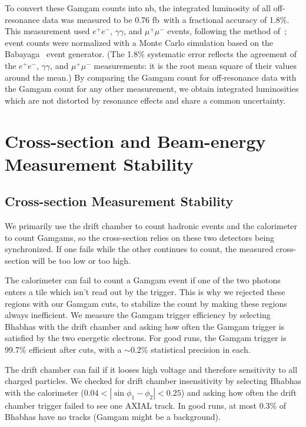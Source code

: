 \documentclass[aps,prd,preprint,superscriptaddress,tightenlines,nofootinbib,floatfix]{revtex4}
\begin{document}
To \label{pag:lumical} convert these Gamgam counts into nb\inv, the
integrated luminosity of all off-resonance data was measured to be
0.76 fb\inv\ with a fractional accuracy of 1.8\%.  This measurement
used $e^+e^-$, $\gamma\gamma$, and $\mu^+\mu^-$ events, following the
method of~\cite{LUMINS}; event counts were normalized with a Monte
Carlo simulation based on the Babayaga~\cite{babayaga} event
generator.  (The 1.8\% systematic error reflects the agreement of the
$e^+e^-$, $\gamma\gamma$, and $\mu^+\mu^-$ measurements: it is the
root mean square of their values around the mean.)  By comparing the
Gamgam count for off-resonance data with the Gamgam count for any
other measurement, we obtain integrated luminosities which are not
distorted by resonance effects and share a common uncertainty.

%
\section{Cross-section and Beam-energy Measurement Stability}
%

%
\subsection{Cross-section Measurement Stability} \label{sec:csstab}
%

We primarily use the drift chamber to count hadronic events and the
calorimeter to count Gamgams, so the cross-section relies on these two
detectors being synchronized.  If one fails while the other continues to count,
the measured cross-section will be too low or too high.

The calorimeter can fail to count a Gamgam event if one of the two
photons enters a tile which isn't read out by the trigger.  This is
why we rejected these regions with our Gamgam cuts, to stabilize the
count by making these regions always inefficient.  We measure the
Gamgam trigger efficiency by selecting Bhabhas with the drift chamber
and asking how often the Gamgam trigger is satisfied by the two
energetic electrons.  For good runs, the Gamgam trigger is 99.7\%
efficient after cuts, with a $\sim$0.2\% statistical precision in each.

The drift chamber can fail if it looses high voltage and therefore
sensitivity to all charged particles.  We checked for drift chamber
insensitivity by selecting Bhabhas with the calorimeter ($0.04 < |\sin
\phi_1 - \phi_2| < 0.25$) and asking how often the drift chamber
trigger failed to see one AXIAL track.  In good runs, at most 0.3\% of
Bhabhas have no tracks (Gamgam might be a background).
\end{document}
